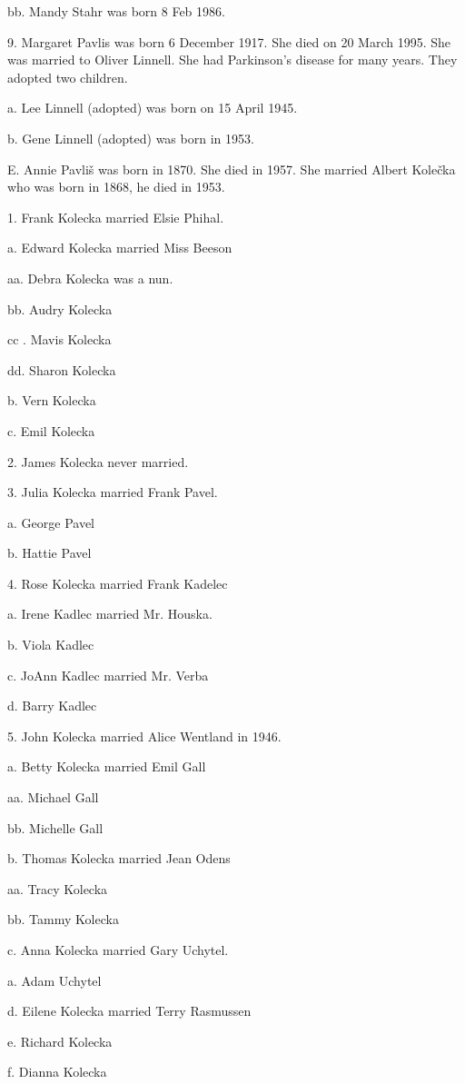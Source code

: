 \documentclass[a4paper]{article}
\begin{document}
bb. Mandy Stahr was born 8 Feb 1986.

9. Margaret Pavlis was born 6 December 1917.  She died on 20 March 1995. She was married to Oliver Linnell.  She had Parkinson's disease for many years. They adopted two children.
			
a. Lee Linnell (adopted) was born on 15 April 1945.

b. Gene Linnell (adopted) was born in 1953.   

E. Annie Pavli\v{s} was born in 1870.  She died in 1957.  She married Albert Kole\v{c}ka who was born in 1868, he died in 1953.

1. Frank Kolecka married Elsie Phihal.

a. Edward Kolecka married Miss Beeson

aa. Debra Kolecka was a nun.

bb. Audry Kolecka

cc . Mavis Kolecka

dd. Sharon Kolecka

b. Vern Kolecka

c. Emil Kolecka 

2. James Kolecka never married.

3. Julia Kolecka married Frank Pavel.

a. George Pavel

b. Hattie Pavel

4. Rose Kolecka married Frank Kadelec

a. Irene Kadlec married Mr. Houska.

b. Viola Kadlec

c. JoAnn Kadlec married Mr. Verba

d. Barry Kadlec

5. John Kolecka married Alice Wentland in 1946.  

a. Betty Kolecka married Emil Gall

aa. Michael Gall

bb. Michelle Gall

b. Thomas Kolecka married Jean Odens

aa. Tracy Kolecka

bb. Tammy Kolecka

c. Anna Kolecka married Gary Uchytel.

a. Adam Uchytel

d. Eilene Kolecka married Terry Rasmussen

e. Richard Kolecka

f. Dianna Kolecka
\end{document}
